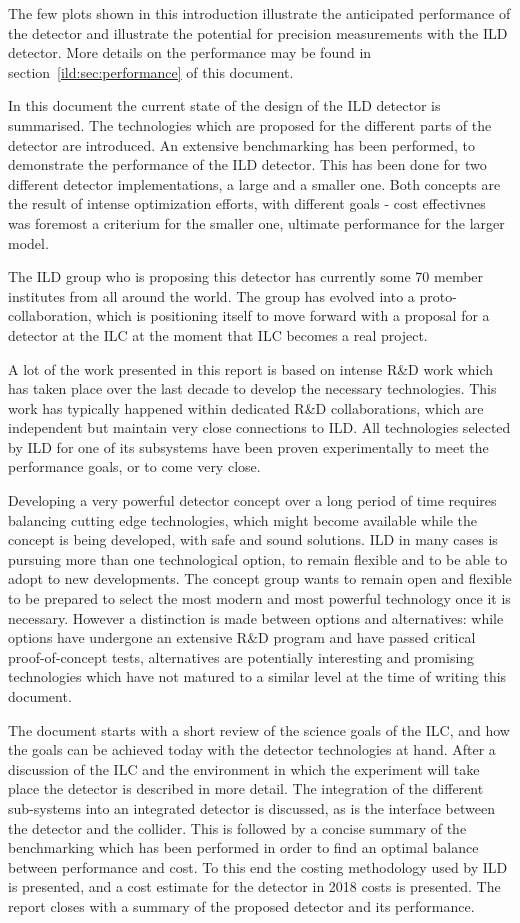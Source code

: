 The few plots shown in this introduction illustrate the anticipated performance of the detector and illustrate the potential for precision measurements with the ILD detector. More details on the performance may be found in section~\ref{ild:sec:performance} of this document. 

In this document the current state of the design of the ILD detector is summarised. The technologies which are proposed for the different parts of the detector are introduced. An extensive benchmarking has been performed, to demonstrate the performance of the ILD detector. This has been done for two different detector implementations, a large and a smaller one. Both concepts are the result of intense optimization efforts, with different goals - cost effectivnes was foremost a criterium for the smaller one, ultimate performance for the larger model. 

The ILD group who is proposing this detector has currently some 70 member institutes from all around the world. The group has evolved into a proto-collaboration, which is positioning itself to move forward with a proposal for a detector at the ILC at the moment that ILC becomes a real project. 

A lot of the work presented in this report is based on intense R\&D work which has taken place over the last decade to develop the necessary technologies. 
This work has typically happened within dedicated R\&D collaborations, which are independent but maintain very close connections to ILD. All technologies selected by ILD for one of its subsystems have been proven experimentally to meet the performance goals, or to come very close. 

Developing a very powerful detector concept over a long period of time requires balancing cutting edge technologies, which might become available while the concept is being developed, with safe and sound solutions. ILD in many cases is pursuing more than one technological option, to remain flexible and to be able to adopt to new developments. The concept group  wants to remain open and flexible to be prepared to select the most modern and most powerful technology once it is necessary. 
However a distinction is made between options and alternatives: while options have undergone an extensive R\&D program and have passed critical proof-of-concept tests, alternatives are potentially interesting and promising technologies which have not matured to a similar level at the time of writing this document. 

The document starts with a short review of the science goals of the ILC, and how the goals can be achieved today with the detector technologies at hand. After a discussion of the ILC and the environment in which the experiment will take place the detector is described in more detail. The integration of the different sub-systems into an integrated detector is discussed, as is the interface between the detector and the collider. This is followed by a concise summary of the benchmarking which has been performed in order to find an optimal balance between performance and cost. To this end the costing methodology used by ILD is presented, and a cost estimate for the detector in 2018 costs is presented. The report closes with a summary of the proposed detector and its performance. 